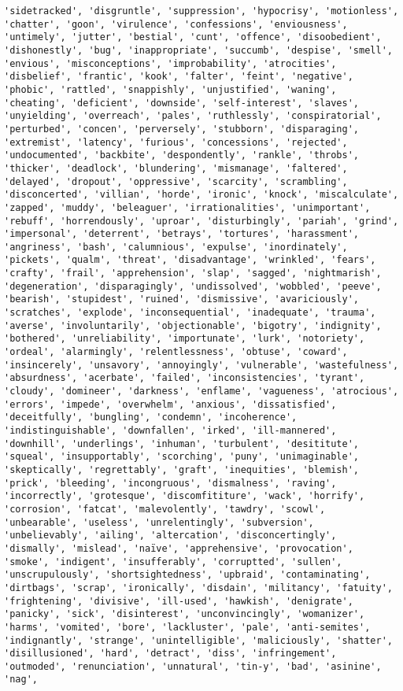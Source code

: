 \documentclass[11pt]{article}
\begin{document}
\begin{Verbatim}[commandchars=\\\{\}]
'sidetracked', 'disgruntle', 'suppression', 'hypocrisy', 'motionless', 'chatter', 'goon', 'virulence', 'confessions', 'enviousness', 'untimely', 'jutter', 'bestial', 'cunt', 'offence', 'disoobedient', 'dishonestly', 'bug', 'inappropriate', 'succumb', 'despise', 'smell', 'envious', 'misconceptions', 'improbability', 'atrocities', 'disbelief', 'frantic', 'kook', 'falter', 'feint', 'negative', 'phobic', 'rattled', 'snappishly', 'unjustified', 'waning', 'cheating', 'deficient', 'downside', 'self-interest', 'slaves', 'unyielding', 'overreach', 'pales', 'ruthlessly', 'conspiratorial', 'perturbed', 'concen', 'perversely', 'stubborn', 'disparaging', 'extremist', 'latency', 'furious', 'concessions', 'rejected', 'undocumented', 'backbite', 'despondently', 'rankle', 'throbs', 'thicker', 'deadlock', 'blundering', 'mismanage', 'faltered', 'delayed', 'dropout', 'oppressive', 'scarcity', 'scrambling', 'disconcerted', 'villian', 'horde', 'ironic', 'knock', 'miscalculate', 'zapped', 'muddy', 'beleaguer', 'irrationalities', 'unimportant', 'rebuff', 'horrendously', 'uproar', 'disturbingly', 'pariah', 'grind', 'impersonal', 'deterrent', 'betrays', 'tortures', 'harassment', 'angriness', 'bash', 'calumnious', 'expulse', 'inordinately', 'pickets', 'qualm', 'threat', 'disadvantage', 'wrinkled', 'fears', 'crafty', 'frail', 'apprehension', 'slap', 'sagged', 'nightmarish', 'degeneration', 'disparagingly', 'undissolved', 'wobbled', 'peeve', 'bearish', 'stupidest', 'ruined', 'dismissive', 'avariciously', 'scratches', 'explode', 'inconsequential', 'inadequate', 'trauma', 'averse', 'involuntarily', 'objectionable', 'bigotry', 'indignity', 'bothered', 'unreliability', 'importunate', 'lurk', 'notoriety', 'ordeal', 'alarmingly', 'relentlessness', 'obtuse', 'coward', 'insincerely', 'unsavory', 'annoyingly', 'vulnerable', 'wastefulness', 'absurdness', 'acerbate', 'failed', 'inconsistencies', 'tyrant', 'cloudy', 'domineer', 'darkness', 'enflame', 'vagueness', 'atrocious', 'errors', 'impede', 'overwhelm', 'anxious', 'dissatisfied', 'deceitfully', 'bungling', 'condemn', 'incoherence', 'indistinguishable', 'downfallen', 'irked', 'ill-mannered', 'downhill', 'underlings', 'inhuman', 'turbulent', 'desititute', 'squeal', 'insupportably', 'scorching', 'puny', 'unimaginable', 'skeptically', 'regrettably', 'graft', 'inequities', 'blemish', 'prick', 'bleeding', 'incongruous', 'dismalness', 'raving', 'incorrectly', 'grotesque', 'discomfititure', 'wack', 'horrify', 'corrosion', 'fatcat', 'malevolently', 'tawdry', 'scowl', 'unbearable', 'useless', 'unrelentingly', 'subversion', 'unbelievably', 'ailing', 'altercation', 'disconcertingly', 'dismally', 'mislead', 'naïve', 'apprehensive', 'provocation', 'smoke', 'indigent', 'insufferably', 'corruptted', 'sullen', 'unscrupulously', 'shortsightedness', 'upbraid', 'contaminating', 'dirtbags', 'scrap', 'ironically', 'disdain', 'militancy', 'fatuity', 'frightening', 'divisive', 'ill-used', 'hawkish', 'denigrate', 'panicky', 'sick', 'disinterest', 'unconvincingly', 'womanizer', 'harms', 'vomited', 'bore', 'lackluster', 'pale', 'anti-semites', 'indignantly', 'strange', 'unintelligible', 'maliciously', 'shatter', 'disillusioned', 'hard', 'detract', 'diss', 'infringement', 'outmoded', 'renunciation', 'unnatural', 'tin-y', 'bad', 'asinine', 'nag', 
\end{Verbatim}
\end{document}
